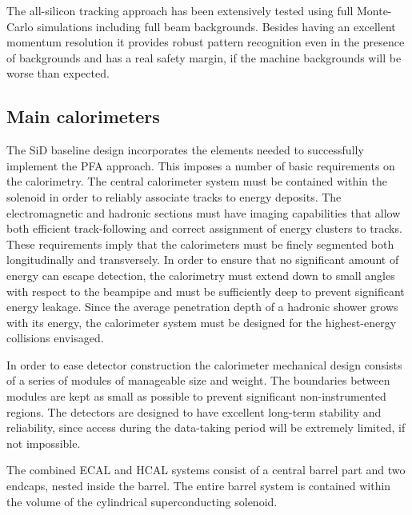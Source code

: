 The all-silicon tracking approach has been extensively tested using full Monte-Carlo
simulations including full beam backgrounds. Besides having an excellent momentum resolution
it provides robust pattern recognition even in the presence of backgrounds and has a
real safety margin, if the machine backgrounds will be worse than expected.

\subsection{Main calorimeters}

The SiD  baseline design incorporates the elements needed to
successfully implement the PFA approach. This imposes a number of
basic requirements on the calorimetry. The central calorimeter
system must be contained within the solenoid in order to reliably associate
tracks to energy deposits. The electromagnetic and hadronic sections
must have imaging capabilities that allow both efficient
track-following and correct assignment of energy clusters to tracks. These
requirements imply that the calorimeters must be finely segmented both
longitudinally and transversely. In order to ensure that no significant amount
of energy can escape detection, the calorimetry must extend down to small
angles with respect to the beampipe and must be sufficiently deep to prevent
significant energy leakage. Since the average penetration depth of a hadronic
shower grows with its energy, the calorimeter system must be designed for the
highest-energy collisions envisaged.

In order to ease detector construction the calorimeter mechanical design consists of a series of modules of
manageable size and weight. The boundaries between
modules are kept as small as possible to prevent significant non-instrumented
regions. The detectors are designed to have excellent long-term stability and reliability,
since access during the data-taking period will be extremely limited, if not
impossible.

The combined ECAL and HCAL systems consist of a
central barrel part and two endcaps, nested inside the barrel. The entire barrel system is contained
within the volume of the cylindrical superconducting solenoid. 


